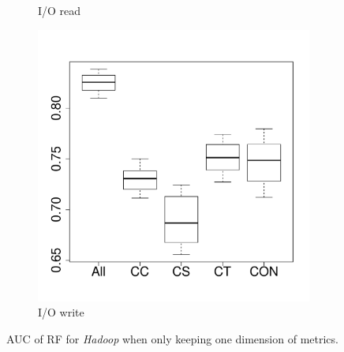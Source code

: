 \begin{figure}[t]
\begin{subfigure}{0.19\textwidth}
                \caption{I/O read}
        \end{subfigure}
        \begin{subfigure}{0.19\textwidth}
                \includegraphics[width=\linewidth]{Figures/iowrite-hadoopkeep-importance.pdf}
                \caption{I/O write}
        \end{subfigure}
        
	\caption{AUC of RF for \emph{Hadoop} when only keeping one dimension of metrics.}
	\label{fig:importance-dimenssion-keep-hadoop}
\end{figure}

